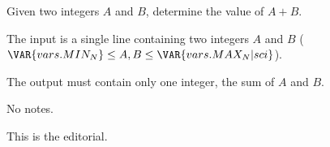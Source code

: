 Given two integers $A$ and $B$, determine the value of $A + B$.

The input is a single line containing two integers $A$ and $B$ ($\VAR{vars.MIN_N} \leq A, B \leq \VAR{vars.MAX_N | sci}$).

The output must contain only one integer, the sum of $A$ and $B$.

No notes.

This is the editorial.
